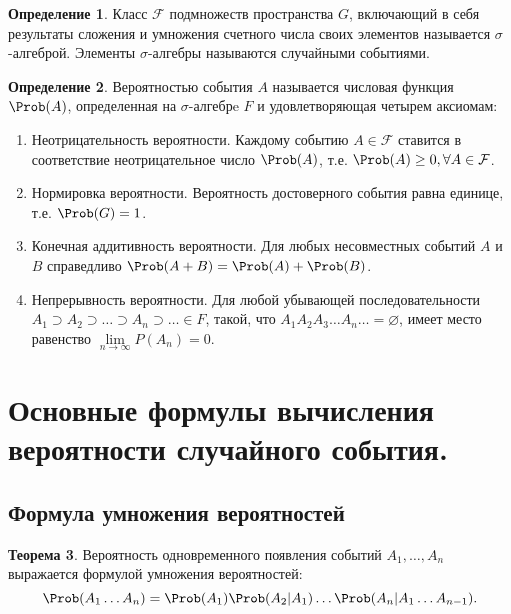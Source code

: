 \documentclass[12pt]{report}
\theoremstyle{definition}
\newtheorem{theorem}{Теорема}[chapter]
\newtheorem{definition}[theorem]{Определение}
\newcommand{\F}{\mathcal F}
\begin{document}
\begin{definition}
Класс $\F$ подмножеств пространства $G$, включающий в себя результаты
сложения и умножения счетного числа своих элементов называется
$\sigma$-алгеброй. Элементы $\sigma$-алгебры называются случайными событиями.
\end{definition}

\begin{definition}
Вероятностью события $A$ называется числовая функция $\Prob(A)$,
определенная на $\sigma$-алгебрe $F$ и удовлетворяющая четырем аксиомам:

\begin{enumerate}
\item Неотрицательность вероятности. Каждому событию
  $A \in \F$ ставится в соответствие неотрицательное число $\Prob(A)$,
  т.е. $\Prob(A) \ge 0, \forall A \in \F$.
\item Нормировка вероятности. Вероятность достоверного события равна
  единице, т.е. $\Prob(G) = 1$.
\item Конечная аддитивность вероятности. Для любых несовместных событий
  $A$ и $B$ справедливо $\Prob(A + B) = \Prob(A) + \Prob(B)$.
\item Непрерывность вероятности. Для любой убывающей последовательности
  $A_1\supset A_2 \supset \dots \supset A_n \supset \dots \in F$, такой,
  что $A_1 A_2 A_3 \dots A_n \dots = \varnothing$, имеет место равенство
  $\lim\limits_{n \rightarrow \infty} P(A_n) = 0$.
\end{enumerate}

\end{definition}



\section{Основные формулы вычисления вероятности случайного события.}

\subsection{Формула умножения вероятностей}
\begin{theorem}
Вероятность одновременного появления событий $A_1, \dots, A_n$
выражается формулой умножения вероятностей:
$$
\Prob(A_1 \dots A_n) = \Prob(A_1) \Prob(A_2|A_1) \dots \Prob(A_n|A_1 \dots A_{n-1}).
$$
\end{theorem}
\end{document}
